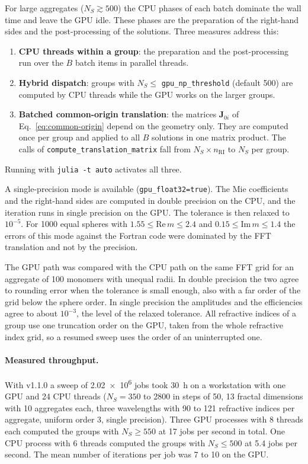 \documentclass[11pt,a4paper]{article}
\begin{document}
For large aggregates ($N_S \gtrsim 500$) the CPU phases of each batch dominate the wall time and leave the GPU idle.
These phases are the preparation of the right-hand sides and the post-processing of the solutions.
Three measures address this:
\begin{enumerate}
  \item \textbf{CPU threads within a group}: the preparation and the post-processing run over the $B$ batch items in parallel threads.
  \item \textbf{Hybrid dispatch}: groups with $N_S \leq$ \texttt{gpu\_np\_threshold} (default 500) are computed by CPU threads while the GPU works on the larger groups.
  \item \textbf{Batched common-origin translation}: the matrices $\mathbf{J}_{0i}$ of Eq.~\eqref{eq:common-origin} depend on the geometry only.
  They are computed once per group and applied to all $B$ solutions in one matrix product.
  The calls of \texttt{compute\_translation\_matrix} fall from $N_S \times n_\mathrm{RI}$ to $N_S$ per group.
\end{enumerate}
Running with \texttt{julia -t auto} activates all three.

A single-precision mode is available (\texttt{gpu\_float32=true}).
The Mie coefficients and the right-hand sides are computed in double precision on the CPU, and the iteration runs in single precision on the GPU.
The tolerance is then relaxed to $10^{-5}$.
For 1000 equal spheres with $1.55 \leq \mathrm{Re}\,m \leq 2.4$ and $0.15 \leq \mathrm{Im}\,m \leq 1.4$ the errors of this mode against the Fortran code were dominated by the FFT translation and not by the precision.

The GPU path was compared with the CPU path on the same FFT grid for an aggregate of 100 monomers with unequal radii.
In double precision the two agree to rounding error when the tolerance is small enough, also with a far order of the grid below the sphere order.
In single precision the amplitudes and the efficiencies agree to about $10^{-3}$, the level of the relaxed tolerance.
All refractive indices of a group use one truncation order on the GPU, taken from the whole refractive index grid, so a resumed sweep uses the order of an uninterrupted one.

\paragraph{Measured throughput.}
With v1.1.0 a sweep of \num{2.02e6} jobs took \SI{30}{\hour} on a workstation with one GPU and 24 CPU threads ($N_S = 350$ to 2800 in steps of 50, 13 fractal dimensions with 10 aggregates each, three wavelengths with 90 to 121 refractive indices per aggregate, uniform order 3, single precision).
Three GPU processes with 8 threads each computed the groups with $N_S \geq 550$ at 17 jobs per second in total.
One CPU process with 6 threads computed the groups with $N_S \leq 500$ at 5.4 jobs per second.
The mean number of iterations per job was 7 to 10 on the GPU.
\end{document}
